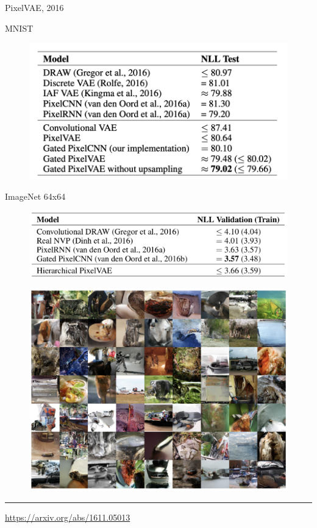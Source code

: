 \begin{frame}{PixelVAE, 2016}
	\begin{minipage}[t]{0.5\columnwidth}
		MNIST
		\begin{figure}
			\centering
			\includegraphics[width=0.9\linewidth]{figs/PixelVAE_5.png}
		\end{figure}
	\end{minipage}%
	\begin{minipage}[t]{0.5\columnwidth}
		ImageNet 64x64
		\begin{figure}
			\centering
			\includegraphics[width=\linewidth]{figs/PixelVAE_4.png}
		\end{figure}
	\end{minipage}
\begin{figure}
    \centering
    \includegraphics[width=0.5\linewidth]{figs/PixelVAE_3.png}
\end{figure}
\vfill
\hrule\medskip
{\scriptsize \href{https://arxiv.org/abs/1611.05013}{https://arxiv.org/abs/1611.05013}}
\end{frame}
